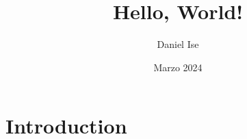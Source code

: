 \documentclass{article}
\title{Hello, World!}
\author{Daniel Ise}
\date{Marzo 2024}
\begin{document}
\section{Introduction}
\end{document}
